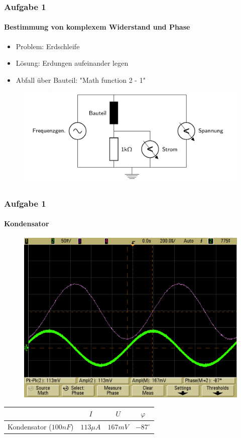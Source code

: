 \begin{frame}
\frametitle{Aufgabe 1}
\framesubtitle{Bestimmung von komplexem Widerstand und Phase}
    \begin{itemize}
        \item Problem: Erdschleife
        \item Lösung: Erdungen aufeinander legen
        \item Abfall über Bauteil: "Math function 2 - 1"
    \end{itemize}
    \begin{figure}[H]
    \begin{center}
            \includegraphics[scale=0.3]{./img/schaltbild_1_mit_erdschleife.png}
    \end{center}
    \end{figure}
\end{frame}

\begin{frame}
\frametitle{Aufgabe 1}
\framesubtitle{Kondensator}
\begin{figure}[H]
    \begin{center}
                \includegraphics[scale=0.15]{./img/1a_Kondensator_1.png}
    \end{center}
\end{figure}
\begin{center}
\begin{tabular}{c|| c | c | c}
    & $I$ & $U$ & $\varphi$ \\
    \hline
    Kondensator ($100nF$)& $113 \mu A$ & $167mV$ & $-87^{\circ}$ \\
\end{tabular}
\end{center}
\end{frame}

